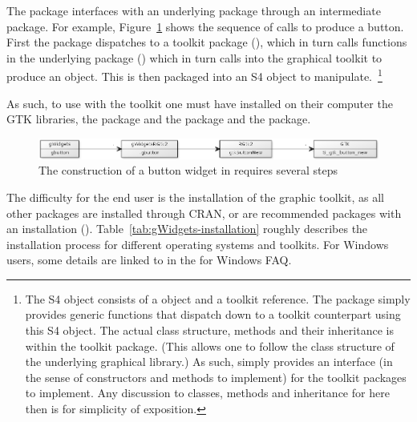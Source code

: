 The  package interfaces with an underlying \R\/ package
through an intermediate package. For example,
Figure~\ref{fig:gWidgets-yuml} shows the sequence of calls to produce
a button. First the  package dispatches to a toolkit
package (), which in turn calls functions in the
underlying \R\/ package () which in turn calls into the
graphical toolkit to produce an object. This is then packaged into an
S4 object to manipulate.~\footnote{The S4 object consists of a
   object and a toolkit reference. The 
  package simply provides generic functions that dispatch down to a
  toolkit counterpart using this S4 object. The actual class
  structure, methods and their inheritance is within the toolkit
  package. (This allows one to follow the class structure of the
  underlying graphical library.) As such,  simply
  provides an interface (in the sense of constructors and methods to
  implement) for the toolkit packages to implement. Any discussion to
  classes, methods and inheritance for  here then is for
  simplicity of exposition.}

As such, to use  with the \GTK\/ toolkit one must have
installed on their computer the GTK\/ libraries, the 
package and the  package and the 
package.


\begin{figure}
  \centering
  \includegraphics[width=.95\textwidth]{fig-gWidgets-yuml}
  \caption{The construction of a button widget in 
    requires several steps}
  \label{fig:gWidgets-yuml}
\end{figure}


The difficulty for the end user is the installation of the graphic
toolkit, as all other packages are installed through CRAN, or are
recommended packages with an \R\/ installation
(). Table~\ref{tab:gWidgets-installation} roughly describes
the installation process for different operating systems and
toolkits. For Windows users, some details are linked to in the \R{}
for Windows FAQ.

